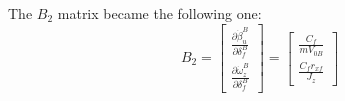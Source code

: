 The $B_{2}$ matrix became the following one:
\begin{equation}
B_{2}=
\begin{bmatrix}
\frac{\partial\dot{\beta}_{u}^{B}}{\partial\delta_{f}^{B}} \\
\frac{\partial\dot{\omega}_{z}^{B}}{\partial\delta_{f}^{B}} 
\end{bmatrix} =
\begin{bmatrix}
\frac{C_{f}}{m V_{0B}} \\ \frac{C_{f}r_{xf}}{J_{z}}
\end{bmatrix} 
\end{equation}

